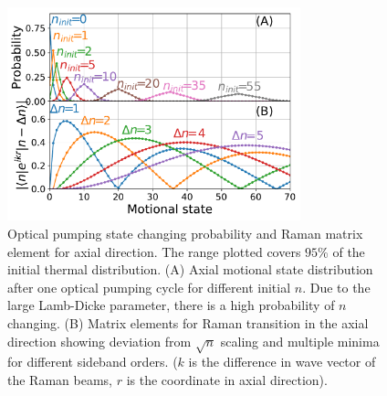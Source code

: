 \documentclass[aps,prl,twocolumn,groupedaddress]{revtex4-1}
\begin{document}
\begin{figure}[b]
  \includegraphics[width=8.5cm]{imgs/fig2_raman_op.pdf}
  \caption{Optical pumping state changing probability and Raman matrix element for axial direction.
    The range plotted covers $95$\% of the initial thermal distribution.
    (A) Axial motional state distribution after one optical pumping cycle
    for different initial $n$. Due to the large Lamb-Dicke parameter,
    there is a high probability of $n$ changing.
    (B) Matrix elements for Raman transition in the axial direction showing deviation from
    $\sqrt{n}$ scaling and multiple minima for different sideband orders.
    ($k$ is the difference in wave vector of the Raman beams,
    $r$ is the coordinate in axial direction).
    \label{f-ld}}
\end{figure}
\end{document}
